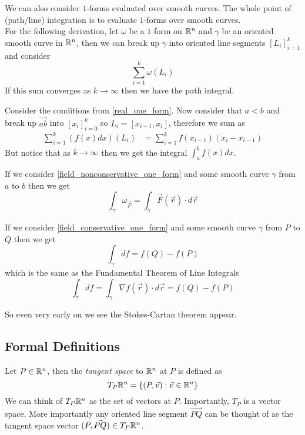 \documentclass[notes]{subfiles}
\begin{document}
We can also consider $1$-forms evaluated over smooth curves. The whole point of (path/line) integration is to evaluate $1$-forms over smooth curves. \\
For the following derivation, let $\omega$ be a $1$-form on $\mathbb{R}^n$ and $\gamma$ be an oriented smooth curve in $\mathbb{R}^n$, then we can break up $\gamma$ into oriented line segments $[L_i]_{i = 1}^k$ and consider
\[
    \sum_{i = 1}^k\omega(L_i)
\]
If this sum converges as $k \to \infty$ then we have the path integral.

\begin{example}
    Consider the conditions from \cref{real_one_form}. Now consider that $a < b$ and break up $\vec{ab}$ into $[x_i]_{i = 0}^k$ so $L_i = [x_{i - 1}, x_i]$, therefore we sum as
    \begin{align*}
        \sum_{i = 1}^k (f(x)dx)(L_i)
        &= \sum_{i = 1}^k f(x_{i - 1})(x_i - x_{i - 1})
    \end{align*}
    But notice that as $k \to \infty$ then we get the integral $\int_a^b f(x)dx$.
\end{example}

\begin{example}
    If we consider \cref{field_nonconservative_one_form} and some smooth curve $\gamma$ from $a$ to $b$ then we get
    \[
        \int_\gamma \omega_{\vec{F}} = \int_\gamma \vec{F}(\vec{r})\cdot d\vec{r}
    \]
\end{example}

\begin{example}
    If we consider \cref{field_conservative_one_form} and some smooth curve $\gamma$ from $P$ to $Q$ then we get
    \[
        \int_\gamma df = f(Q) - f(P)
    \]
    which is the same as the Fundamental Theorem of Line Integrals
    \[
        \int_\gamma df = \int_\gamma \nabla f(\vec{r})\cdot d\vec{r} = f(Q) - f(P)
    \]
\end{example}
So even very early on we see the Stokes-Cartan theorem appear.

\subsection{Formal Definitions}
\begin{definition}
    Let $P \in \mathbb{R}^n$, then the \textit{tangent space} to $\mathbb{R}^n$ at $P$ is defined as
    \[
        T_P \mathbb{R}^n = \{ (P, \vec{v}) : \vec{v} \in \mathbb{R}^n \}
    \]
    We can think of $T_P\mathbb{R}^n$ as the set of vectors at $P$. Importantly, $T_P$ is a vector space. More importantly any oriented line segment $\vec{PQ}$ can be thought of as the tangent space vector $(P, \vec{PQ}) \in T_P\mathbb{R}^n$.
\end{definition}
\end{document}

